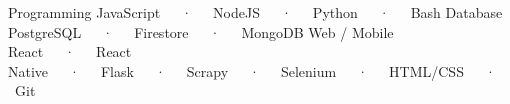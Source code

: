 

\begin{cvtechnicals}
  \cvtechnical %
    {Programming} %
    {JavaScript~~~·~~~NodeJS~~~·~~~Python~~~·~~~Bash} %
    {Database} %
    {PostgreSQL~~~·~~~Firestore~~~·~~~MongoDB} %
    {Web / Mobile} %
    {React~~~·~~~React Native~~~·~~~Flask~~~·~~~Scrapy~~~·~~~Selenium~~~·~~~HTML/CSS~~~·~~~Git} %
\end{cvtechnicals}